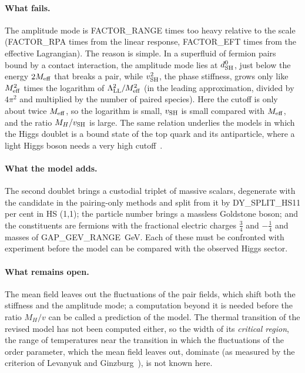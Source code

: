 \documentclass[aps,prd,twocolumn,superscriptaddress,nofootinbib,floatfix,longbibliography]{revtex4-2}
\newcommand{\LL}{{\rm LL}}
\newcommand{\SH}{{\rm SH}}
\begin{document}
\paragraph*{What fails.}
The amplitude mode is {{FACTOR_RANGE}} times too heavy relative to the scale ({{FACTOR_RPA}} times from the linear
response, {{FACTOR_EFT}} times from the effective Lagrangian). The reason is simple. In a superfluid of fermion pairs
bound by a contact interaction, the amplitude mode lies at $d^0_\SH$, just below the energy $2M_{\rm eff}$ that breaks a
pair, while $v_\SH^2$, the phase stiffness, grows only like $M_{\rm eff}^2$ times the logarithm of
$\Lambda_\LL^2/M_{\rm eff}^2$ (in the leading approximation, divided by $4\pi^2$ and multiplied by the number of paired
species). Here the cutoff is only about twice $M_{\rm eff}$, so the logarithm is small, $v_\SH$ is small compared with
$M_{\rm eff}$, and the ratio $M_H/v_\SH$ is large. The same relation underlies the models in which the Higgs doublet is a
bound state of the top quark and its antiparticle, where a light Higgs boson needs a very high cutoff~\cite{BHL1990}.

\paragraph*{What the model adds.}
The second doublet brings a custodial triplet of massive scalars, degenerate with the candidate in the pairing-only
methods and split from it by {{DY_SPLIT_HS11}} per cent in HS (1,1); the particle number brings a massless Goldstone
boson; and the constituents are fermions with the fractional electric charges $\frac34$ and $-\frac14$ and masses of
{{GAP_GEV_RANGE}}~GeV. Each of these must be confronted with experiment before the model can be compared with the
observed Higgs sector.

\paragraph*{What remains open.}
The mean field leaves out the fluctuations of the pair fields, which shift both the stiffness and the amplitude mode; a
computation beyond it is needed before the ratio $M_H/v$ can be called a prediction of the model. The thermal transition
of the revised model has not been computed either, so the width of its \emph{critical region}, the range of temperatures
near the transition in which the fluctuations of the order parameter, which the mean field leaves out, dominate (as
measured by the criterion of Levanyuk and Ginzburg~\cite{Levanyuk1959,Ginzburg1960}), is not known here.
\end{document}
